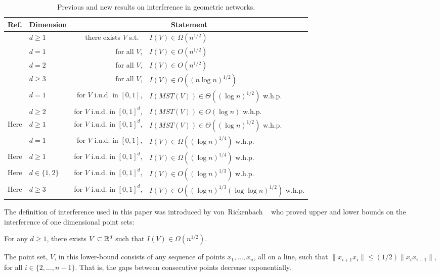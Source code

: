 \documentclass{patmorin}
\newcommand{\mst}{\mathit{MST}}
\begin{document}
\begin{table*}
\begin{center}
  \begin{tabular}{|l|l|r@{ }l|}\hline
    Ref. & Dimension & \multicolumn{2}{c|}{Statement} \\ \hline
    \cite{vR05} & $d\ge 1$ & there exists $V$ s.t.\ & $I(V)\in \Omega(n^{1/2})$ \\
    \cite{vR05} & $d=1$ & for all $V$, & $I(V)\in O(n^{1/2})$ \\
    \cite{ht08} & $d=2$ & for all $V$, & $I(V)\in O(n^{1/2})$ \\
    \cite{ht08} & $d\ge 3$ & for all $V$, & $I(V)\in O((n\log n)^{1/2})$ \\
    \cite{kkmns10} & $d= 1$ & for $V$ i.u.d. in $[0,1]$, & $I(\mst(V))\in \Theta((\log n)^{1/2})$ w.h.p. \\
    \cite{kdhk15} & $d\ge 2$ & for $V$ i.u.d. in $[0,1]^d$, & $I(\mst(V))\in O(\log n)$ w.h.p.  \\
    Here & $d\ge 1$ & for $V$ i.u.d. in $[0,1]^d$, & $I(\mst(V))\in \Theta((\log n)^{1/2})$ w.h.p.  \\ 
    \cite{kkmns10,vR05} & $d = 1$ & for $V$ i.u.d. in $[0,1]$, & $I(V)\in\Omega((\log n)^{1/4})$ w.h.p.  \\
    Here & $d\ge 1$ & for $V$ i.u.d. in $[0,1]^d$,  & $I(V)\in \Omega((\log n)^{1/4})$ w.h.p.  \\ 
    Here & $d\in\{1,2\}$ & for $V$ i.u.d. in $[0,1]^d$, & $I(V)\in O((\log n)^{1/3})$ w.h.p.  \\
    Here & $d\ge 3$ & for $V$ i.u.d. in $[0,1]^d$, & $I(V)\in O((\log n)^{1/3}(\log\log n)^{1/2})$ w.h.p.  \\
  \hline
  \end{tabular}
\end{center}
\caption{Previous and new results on interference in geometric networks.}
\end{table*}

The definition of interference used in this paper was introduced by
von~Rickenbach \etal\ \cite{vR05} who proved upper and
lower bounds on the interference of one dimensional point sets:
\begin{thm}
For any $d\ge 1$, there exists $V\subset\mathbb{R}^{d}$ such
that $I(V)\in\Omega(n^{1/2})$.
\end{thm}
The point set, $V$, in this lower-bound consists of any sequence of
points $x_1,\ldots,x_n$, all on a line, such that $\|x_{i+1}x_i\| \le (1/2)\|x_{i}x_{i-1}\|$,
for all $i\in\{2,\ldots,n-1\}$.  That is, the gaps between consecutive
points decrease exponentially.
\end{document}
